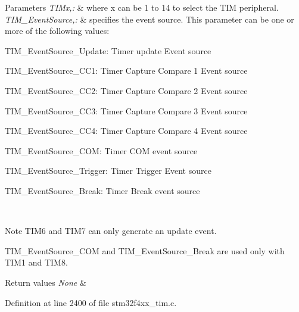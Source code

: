 \begin{DoxyParams}{Parameters}
{\em T\-I\-Mx,\-:} & where x can be 1 to 14 to select the T\-I\-M peripheral. \\
\hline
{\em T\-I\-M\-\_\-\-Event\-Source,\-:} & specifies the event source. This parameter can be one or more of the following values\-: \begin{DoxyItemize}
\item T\-I\-M\-\_\-\-Event\-Source\-\_\-\-Update\-: Timer update Event source \item T\-I\-M\-\_\-\-Event\-Source\-\_\-\-C\-C1\-: Timer Capture Compare 1 Event source \item T\-I\-M\-\_\-\-Event\-Source\-\_\-\-C\-C2\-: Timer Capture Compare 2 Event source \item T\-I\-M\-\_\-\-Event\-Source\-\_\-\-C\-C3\-: Timer Capture Compare 3 Event source \item T\-I\-M\-\_\-\-Event\-Source\-\_\-\-C\-C4\-: Timer Capture Compare 4 Event source \item T\-I\-M\-\_\-\-Event\-Source\-\_\-\-C\-O\-M\-: Timer C\-O\-M event source \item T\-I\-M\-\_\-\-Event\-Source\-\_\-\-Trigger\-: Timer Trigger Event source \item T\-I\-M\-\_\-\-Event\-Source\-\_\-\-Break\-: Timer Break event source\end{DoxyItemize}
\\
\hline
\end{DoxyParams}
\begin{DoxyNote}{Note}
T\-I\-M6 and T\-I\-M7 can only generate an update event. 

T\-I\-M\-\_\-\-Event\-Source\-\_\-\-C\-O\-M and T\-I\-M\-\_\-\-Event\-Source\-\_\-\-Break are used only with T\-I\-M1 and T\-I\-M8.
\end{DoxyNote}

\begin{DoxyRetVals}{Return values}
{\em None} & \\
\hline
\end{DoxyRetVals}


Definition at line 2400 of file stm32f4xx\-\_\-tim.\-c.


